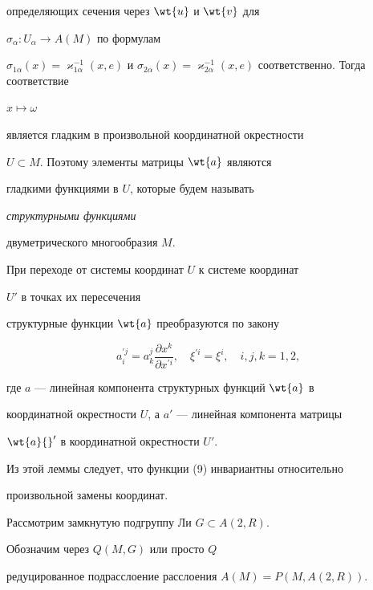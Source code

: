 определяющих сечения через $\wt{u}$ и $\wt{v}$ для


$\sigma_{\alpha}: U_{\alpha} \to A(M)$ по формулам


$\sigma_{1\alpha}(x)=\varkappa^{-1}_{1\alpha}(x,e)$ и $\sigma_{2\alpha}(x) =


\varkappa^{-1}_{2\alpha}(x,e)$ соответственно. Тогда соответствие


$x \mapsto \omega$


является гладким в произвольной координатной окрестности


$U \subset M$. Поэтому элементы матрицы $\wt{a}$ являются


гладкими функциями в $U$, которые будем называть


{\it структурными функциями}


двуметрического многообразия $M$.





\begin{lemnonum}


При переходе от системы координат $U$ к системе координат


$U'$ в точках их пересечения


структурные функции $\wt{a}$ преобразуются по закону


$$


a_{i}^{\prime j}=a_k^j\frac{\partial x^k}{\partial x^{'i}},\quad


\xi^{\prime i}=\xi^i,\quad i,j,k=1,2,


$$


где $a$ --- линейная компонента структурных функций $\wt{a}$ в


координатной окрестности $U$, а $a'$ --- линейная компонента матрицы


$\wt{a}{}'$ в координатной окрестности $U'$.


\end{lemnonum}





Из этой леммы следует, что функции (9) инвариантны относительно


произвольной замены координат.





Рассмотрим замкнутую подгруппу Ли $G \subset A(2,R)$.


Обозначим через $Q(M,G)$ или просто $Q$


редуцированное подрасслоение расслоения $A(M)=P(M,A(2,R))$.


